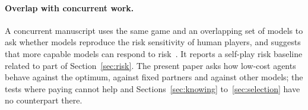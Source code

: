 \paragraph{Overlap with concurrent work.}
A concurrent manuscript uses the same game and an overlapping set of models to ask whether
models reproduce the risk sensitivity of human players, and suggests that more capable models
can respond to risk~\cite{anon-if}. It reports a self-play risk baseline related to part of
Section~\ref{sec:risk}. The present paper asks how low-cost agents behave against the
optimum, against fixed partners and against other models; the tests where paying cannot
help and Sections~\ref{sec:knowing} to~\ref{sec:selection} have no counterpart there.
